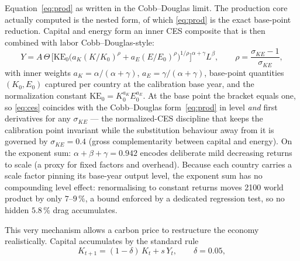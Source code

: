 \documentclass[a4paper,fleqn]{cas-sc}
\begin{document}
Equation~\eqref{eq:prod} as written in the Cobb--Douglas limit. The
production core actually computed is the nested form, of which \eqref{eq:prod} is the exact
base-point reduction. Capital and energy form an inner CES composite that is then combined with
labor Cobb--Douglas-style:
\begin{equation}
Y = A\,\Theta\,\Big[\mathrm{KE}_0\big(a_K (K/K_0)^{\rho} + a_E (E/E_0)^{\rho}\big)^{1/\rho}\Big]^{\alpha+\gamma} L^{\beta},
\qquad \rho = \frac{\sigma_{KE}-1}{\sigma_{KE}},
\label{eq:ces}
\end{equation}
with inner weights $a_K = \alpha/(\alpha+\gamma)$, $a_E = \gamma/(\alpha+\gamma)$, base-point
quantities $(K_0, E_0)$ captured per country at the calibration base year, and the normalization
constant $\mathrm{KE}_0 = K_0^{a_K} E_0^{a_E}$. At the base point the bracket equals one, so
\eqref{eq:ces} coincides with the Cobb--Douglas form~\eqref{eq:prod} in level \emph{and} first
derivatives for any $\sigma_{KE}$ --- the normalized-CES discipline that keeps the calibration
point invariant while the substitution behaviour away from it is governed by $\sigma_{KE}=0.4$
(gross complementarity between capital and energy). On the exponent sum: $\alpha+\beta+\gamma =
0.942$ encodes deliberate mild decreasing returns to scale (a proxy for fixed factors and
overhead). Because each country carries a scale factor pinning its base-year output level, the
exponent sum has no compounding level effect: renormalising to constant returns moves 2100 world
product by only $7$--$9\,\%$, a bound enforced by a dedicated regression test, so no hidden
$5.8\,\%$ drag accumulates.


This very mechanism allows a carbon price to restructure the economy
realistically. Capital accumulates by the standard rule
\begin{equation}
K_{t+1} = (1-\delta)\,K_t + s\,Y_t, \qquad \delta = 0.05,
\label{eq:capital}
\end{equation}
\end{document}
